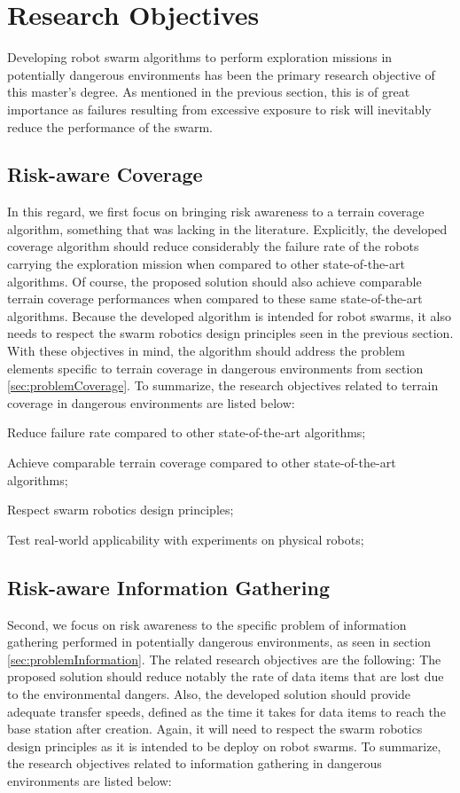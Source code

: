 \section{Research Objectives} 
\label{sec:objectifs}

Developing robot swarm algorithms to perform exploration missions in potentially dangerous environments has been the primary research objective of this master's degree. As mentioned in the previous section, this is of great importance as failures resulting from excessive exposure to risk will inevitably reduce the performance of the swarm. 

\subsection{Risk-aware Coverage}
In this regard, we first focus on bringing risk awareness to a terrain coverage algorithm, something that was lacking in the literature. Explicitly, the developed coverage algorithm should reduce considerably the failure rate of the robots carrying the exploration mission when compared to other state-of-the-art algorithms. Of course, the proposed solution should also achieve comparable terrain coverage performances when compared to these same state-of-the-art algorithms. Because the developed algorithm is intended for robot swarms, it also needs to respect the swarm robotics design principles seen in the previous section. With these objectives in mind, the algorithm should address the problem elements specific to terrain coverage in dangerous environments from section \ref{sec:problemCoverage}. To summarize, the research objectives related to terrain coverage in dangerous environments are listed below:

\begin{compactenum}
    \item Reduce failure rate compared to other state-of-the-art algorithms;
    \item Achieve comparable terrain coverage compared to other state-of-the-art algorithms;
    \item Respect swarm robotics design principles;
    \item Test real-world applicability with experiments on physical robots;
\end{compactenum}


\subsection{Risk-aware Information Gathering}
Second, we focus on risk awareness to the specific problem of information gathering performed in potentially dangerous environments, as seen in section \ref{sec:problemInformation}. The related research objectives are the following: The proposed solution should reduce notably the rate of data items that are lost due to the environmental dangers. Also, the developed solution should provide adequate transfer speeds, defined as the time it takes for data items to reach the base station after creation. Again, it will need to respect the swarm robotics design principles as it is intended to be deploy on robot swarms. To summarize, the research objectives related to information gathering in dangerous environments are listed below:

